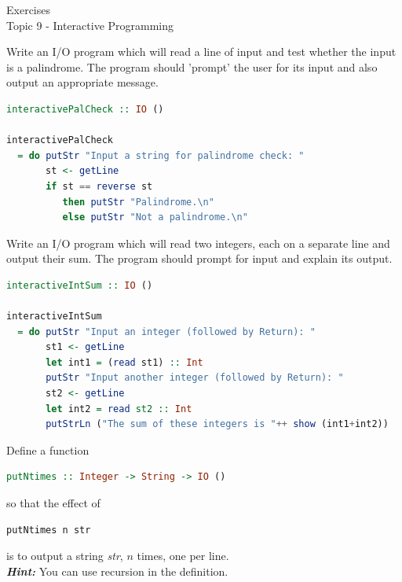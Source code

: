 \documentclass{article}
\newcommand\ExTitle{Topic 9 - Interactive Programming}
\newcommand\fullExTitle{Exercises \\ \ExTitle }
\begin{document}
\begin{Huge}
	\begin{center}
	\fullExTitle
	\end{center}
\end{Huge}
\begin{exercise}
Write an I/O program which will read a line of input and test whether the input is a palindrome. The program should 'prompt' the user for its input and also output an appropriate message.
\end{exercise}

\begin{solution}
\begin{lstlisting}[language=Haskell]
interactivePalCheck :: IO ()

interactivePalCheck
  = do putStr "Input a string for palindrome check: "
       st <- getLine
       if st == reverse st 
          then putStr "Palindrome.\n"
          else putStr "Not a palindrome.\n"
\end{lstlisting}
          
\end{solution}

\begin{exercise}
Write an I/O program which will read two integers, each on a separate line and output their sum. The program should prompt for input and explain its output.
\end{exercise}

\begin{solution}
\begin{lstlisting}[language=Haskell]
interactiveIntSum :: IO ()

interactiveIntSum
  = do putStr "Input an integer (followed by Return): "
       st1 <- getLine
       let int1 = (read st1) :: Int
       putStr "Input another integer (followed by Return): "
       st2 <- getLine
       let int2 = read st2 :: Int
       putStrLn ("The sum of these integers is "++ show (int1+int2))
\end{lstlisting}
\end{solution}


\begin{exercise}
Define a  function \\
\begin{lstlisting}[language=Haskell]
putNtimes :: Integer -> String -> IO ()
\end{lstlisting}
so that the effect of
\begin{lstlisting}[language=Haskell]
 putNtimes n str
\end{lstlisting}
 is to output a string \textit{str}, $n$ times, one per line. \\
 \textbf{\textit{Hint: }} You can use recursion in the definition. 
\end{exercise}
\end{document}
